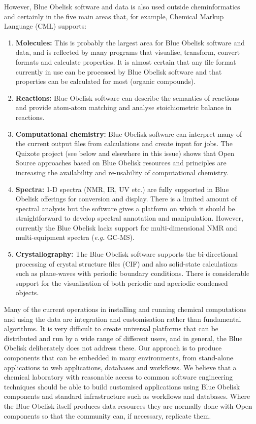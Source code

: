 \documentclass[10pt]{bmc_article}
\newenvironment{bmcformat}{\begin{raggedright}\baselineskip20pt\sloppy\setboolean{publ}{false}}{\end{raggedright}\baselineskip20pt\sloppy}
\begin{document}
\begin{bmcformat}
However, Blue Obelisk software and data is also used outside
cheminformatics and certainly in the five main areas that, for
example, Chemical Markup Language (CML) \cite{murray-rust_chemical_1999} supports:

\begin{enumerate}
\item {\bf Molecules:} This is probably the largest area for Blue
Obelisk software and data, and is reflected by many programs that
visualise, transform, convert formats and calculate properties. It is
almost certain that any file format currently in use can be processed by Blue
Obelisk software and that properties can be calculated for most (organic
compounds).
\item {\bf Reactions:} Blue Obelisk software can describe the
semantics of reactions and provide atom-atom matching and analyse
stoichiometric balance in reactions.
\item {\bf Computational chemistry:} Blue Obelisk software can
interpret many of the current output files from calculations and
create input for jobs. The Quixote project (see below and elsewhere in
this issue) shows that Open Source approaches based on Blue Obelisk
resources and principles are increasing the availability and
re-usability of computational chemistry.
\item {\bf Spectra:} 1-D spectra (NMR, IR, UV etc.) are fully
supported in Blue Obelisk offerings for conversion and display. There
is a limited amount of spectral analysis but the software gives a
platform on which it should be straightforward to develop spectral
annotation and manipulation. However, currently the Blue Obelisk lacks
support for multi-dimensional NMR and multi-equipment spectra
({\it e.g.} GC-MS).
\item {\bf Crystallography:} The Blue Obelisk software supports the
bi-directional processing of crystal structure files (CIF) and also
solid-state calculations such as plane-waves with periodic boundary
conditions. There is considerable support for the visualisation of
both periodic and aperiodic condensed objects.
\end{enumerate}

Many of the current operations in installing and running chemical
computations and using the data are integration and customisation
rather than fundamental algorithms. It is very difficult to create
universal platforms that can be distributed and run by a wide range of
different users, and in general, the Blue Obelisk deliberately does
not address these. Our approach is to produce components that can be
embedded in many environments, from stand-alone applications to web
applications, databases and workflows.
We believe that a chemical laboratory with reasonable access to common
software engineering techniques should be able to build customised applications
using Blue Obelisk components and standard infrastructure such as
workflows and databases.
Where the Blue Obelisk itself produces data resources
they are normally done with Open components
so that the community can, if necessary, replicate them.


\end{bmcformat}
\end{document}
